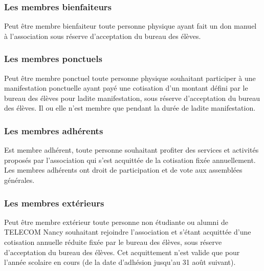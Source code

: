 \documentclass{article}
\begin{document}
			\subsubsection{Les membres bienfaiteurs}
\label{ssub:les_membres_bienfaiteurs}
				Peut être membre bienfaiteur toute personne physique ayant fait
				un don manuel à l’association sous réserve d’acceptation du
				bureau des élèves.

			\subsubsection{Les membres ponctuels}
\label{ssub:les_membres_ponctuels}
			
				Peut être membre ponctuel toute personne physique souhaitant
				participer à une manifestation ponctuelle ayant payé une
				cotisation d’un montant défini par le bureau des élèves pour
				ladite manifestation, sous réserve d’acceptation du bureau des
				élèves. Il ou elle n’est membre que pendant la durée de ladite
				manifestation.

			\subsubsection{Les membres adhérents}
\label{ssub:les_membres_adherents}
			
				Est membre adhérent, toute personne souhaitant profiter des
				services et activités proposés par l’association qui s’est
				acquittée de la cotisation fixée annuellement. Les membres
				adhérents ont droit de participation et de vote aux assemblées
				générales.

			\subsubsection{Les membres extérieurs}
\label{ssub:les_membres_exterieurs}
			
				Peut être membre extérieur toute personne non étudiante ou
				alumni de TELECOM Nancy souhaitant rejoindre l’association et
				s'étant acquittée d’une cotisation annuelle réduite fixée par le
				bureau des élèves, sous réserve d'acceptation du bureau des
				élèves. Cet acquittement n’est valide que pour l’année scolaire
				en cours (de la date d’adhésion jusqu’au 31 août suivant).
\end{document}
